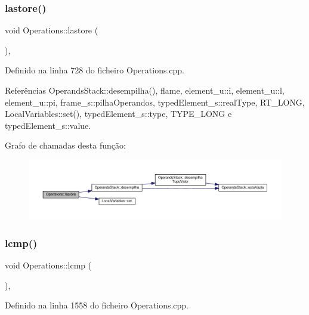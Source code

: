 \subsubsection{\texorpdfstring{lastore()}{lastore()}}
{\footnotesize\ttfamily void Operations\+::lastore (\begin{DoxyParamCaption}{ }\end{DoxyParamCaption})\hspace{0.3cm}{\ttfamily [static]}, {\ttfamily [private]}}



Definido na linha 728 do ficheiro Operations.\+cpp.



Referências Operands\+Stack\+::desempilha(), flame, element\+\_\+u\+::i, element\+\_\+u\+::l, element\+\_\+u\+::pi, frame\+\_\+s\+::pilha\+Operandos, typed\+Element\+\_\+s\+::real\+Type, R\+T\+\_\+\+L\+O\+NG, Local\+Variables\+::set(), typed\+Element\+\_\+s\+::type, T\+Y\+P\+E\+\_\+\+L\+O\+NG e typed\+Element\+\_\+s\+::value.

Grafo de chamadas desta função\+:
\nopagebreak
\begin{figure}[H]
\begin{center}
\leavevmode
\includegraphics[width=350pt]{classOperations_a562813150c331183212c11e5593b83c6_cgraph}
\end{center}
\end{figure}
\mbox{\label{classOperations_a7ad4ad0e417096686b55dde9142b830a}} 
\subsubsection{\texorpdfstring{lcmp()}{lcmp()}}
{\footnotesize\ttfamily void Operations\+::lcmp (\begin{DoxyParamCaption}{ }\end{DoxyParamCaption})\hspace{0.3cm}{\ttfamily [static]}, {\ttfamily [private]}}



Definido na linha 1558 do ficheiro Operations.\+cpp.



